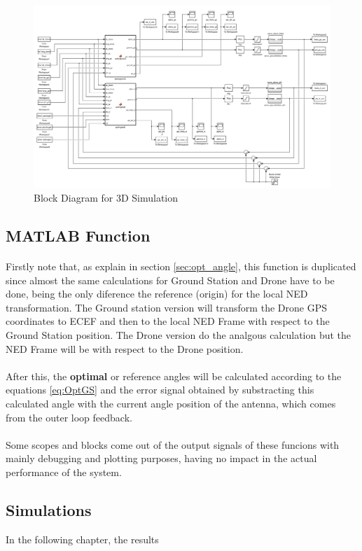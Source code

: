 \clearpage

\begin{figure}
	\centering
	\includegraphics[width=1.1\textwidth,height=1.1\textheight,keepaspectratio]{figures/diagram_3D.png}
	\caption{Block Diagram for 3D Simulation}
   	\label{fig:diagram3D}
\end{figure}

\clearpage

\subsection*{MATLAB Function}
\paragraph{}Firstly note that, as explain in section \ref{sec:opt_angle}, this function is duplicated since almost the same calculations for Ground Station and Drone have to be done, being the only diference the reference (origin) for the local NED transformation.
The Ground station version will transform the Drone GPS coordinates to ECEF and then to the local NED Frame with respect to the Ground Station position. The Drone version do the analgous calculation but the NED Frame will be with respect to the Drone position.

\paragraph{}After this, the \textbf{optimal} or {reference} angles will be calculated according to the equations \ref{eq:OptGS} and the error signal obtained by substracting this calculated angle with the current angle position of the antenna, which comes from the outer loop feedback.

\paragraph{} Some scopes and blocks come out of the output signals of these funcions with mainly debugging and plotting purposes, having no impact in the actual performance of the system. 

\subsection*{Simulations}

In the following chapter, the results